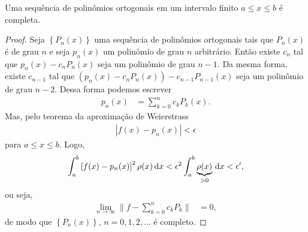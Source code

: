 \begin{teo}
    Uma sequ\^{e}ncia de polin\^{o}mios ortogonais em um intervalo finito $a \leq x \leq b$ \'{e} completa.
\end{teo}
\begin{proof}
    Seja $\left\{ P_n(x) \right\}$ uma sequ\^{e}ncia de polin\^{o}mios ortogonais tais que $P_n(x)$ \'{e} de grau $n$ e seja $p_n(x)$ um polin\^{o}mio de grau $n$ arbitr\'{a}rio. Ent\~{a}o existe $c_n$ tal que $p_n(x) - c_n P_n(x)$ seja um polin\^{o}mio de grau $n - 1$. Da mesma forma, existe $c_{n - 1}$ tal que $\left( p_n(x) - c_n P_n(x) \right) - c_{n - 1} P_{n - 1}(x)$ seja um polin\^{o}mio de grau $n - 2$. Dessa forma podemos escrever
    \begin{align*}
        p_n(x) &= \sum_{k = 0}^n c_k P_k(x).
    \end{align*}
    Mas, pelo teorema da aproxima\c{c}\~{a}o de Weierstrass
    \begin{align*}
        | f(x) - p_n(x) | < \epsilon
    \end{align*}
    para $a \leq x \leq b$. Logo,
    \begin{align*}
        \int_a^b \left[ f(x) - p_n(x) \right]^2 \rho(x) \, \mathrm{d}x < \epsilon^2 \int_a^b \underbrace{\rho(x)}_{>0} \, \mathrm{d}x < \epsilon',
    \end{align*}
    ou seja,
    \begin{align*}
        \lim_{n \to \infty} \| f - \sum_{k = 0}^n c_k P_k \| &= 0,
    \end{align*}
    de modo que $\left\{ P_n(x) \right\}$, $n = 0, 1, 2, \ldots$ \'{e} completo.
\end{proof}

